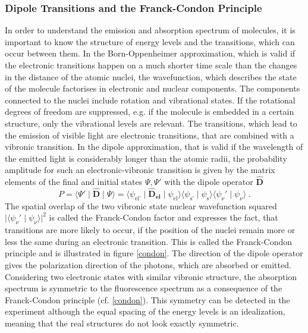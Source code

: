 \documentclass{scrartcl}
\numberwithin{equation}{section}
\numberwithin{figure}{section}
\numberwithin{table}{section}
\newcommand{\eq}[2]{\begin{equation}#1\label{#2}\end{equation}}
\newcommand{\ve}[1]{\mathbf{ #1} }
\begin{document}
\subsubsection{Dipole Transitions and the Franck-Condon Principle}
In order to understand the emission and absorption spectrum of molecules, it is important to know the structure of energy levels and the transitions, which can occur between them. In the Born-Oppenheimer approximation, which is valid if the electronic transitions happen on a much shorter time scale than the changes in the distance of the atomic nuclei, the wavefunction, which describes the state of the molecule factorises in electronic and nuclear components. The components connected to the nuclei include rotation and vibrational states. If the rotational degrees of freedom are suppressed, e.g. if the molecule is embedded in a certain structure, only the vibrational levels are relevant. The transitions, which lead to the emission of visible light are electronic transitions, that are combined with a vibronic transition. In the dipole approximation, that is valid if the wavelength of the emitted light is considerably longer than the atomic radii, the probability amplitude for such an electronic-vibronic transition is given by the matrix elements of the final and initial states $\Psi,\Psi'$ with the dipole operator $\ve {\hat{D}}$
\eq{ P = \langle \Psi'  \mid   \ve {\hat{D}} \mid \Psi \rangle =  \langle \psi_\text{el'} \mid   \ve {\hat{D}_{el}} \mid \psi_\text{el} \rangle \langle \psi_\text{s'} \mid \psi_\text{s} \rangle \langle \psi_\nu'  \mid  \psi_\nu \rangle \; .} {transition }
The spatial overlap of the two vibronic state nuclear wavefunction squared  $\lvert \langle \psi_\nu'  \mid  \psi_\nu \rangle \rvert ^2$ is called the Franck-Condon factor and expresses the fact, that transitions are more likely to occur, if the position of the nuclei remain more or less the same during an electronic transition. This is called the Franck-Condon principle and is illustrated in figure \ref{condon}. 
The direction of the dipole operator gives the polarization direction of the photons, which are absorbed or emitted.
Considering two electronic states with similar vibronic structure, the absorption spectrum is symmetric to the fluorescence spectrum as a consequence of the Franck-Condon principle (cf. \ref{condon}). This symmetry can be detected in the experiment although the equal spacing of the energy levels is an idealization, meaning that the real structures do not look exactly symmetric.
\end{document}
